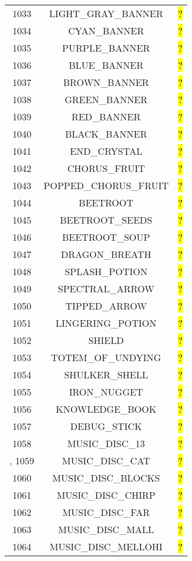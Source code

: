 \documentclass[11pt]{article}
\newcommand\myworries[1]{\sethlcolor{red}\hl{#1}}
\begin{document}
\begin{longtable}{ |c|c|c| }
1033 & LIGHT\_GRAY\_BANNER & \myworries{?} \\
1034 & CYAN\_BANNER & \myworries{?} \\
1035 & PURPLE\_BANNER & \myworries{?} \\
1036 & BLUE\_BANNER & \myworries{?} \\
1037 & BROWN\_BANNER & \myworries{?} \\
1038 & GREEN\_BANNER & \myworries{?} \\
1039 & RED\_BANNER & \myworries{?} \\
1040 & BLACK\_BANNER & \myworries{?} \\
1041 & END\_CRYSTAL & \myworries{?} \\
1042 & CHORUS\_FRUIT & \myworries{?} \\
1043 & POPPED\_CHORUS\_FRUIT & \myworries{?} \\
1044 & BEETROOT & \myworries{?} \\
1045 & BEETROOT\_SEEDS & \myworries{?} \\
1046 & BEETROOT\_SOUP & \myworries{?} \\
1047 & DRAGON\_BREATH & \myworries{?} \\
1048 & SPLASH\_POTION & \myworries{?} \\
1049 & SPECTRAL\_ARROW & \myworries{?} \\
1050 & TIPPED\_ARROW & \myworries{?} \\
1051 & LINGERING\_POTION & \myworries{?} \\
1052 & SHIELD & \myworries{?} \\
1053 & TOTEM\_OF\_UNDYING & \myworries{?} \\
1054 & SHULKER\_SHELL & \myworries{?} \\
1055 & IRON\_NUGGET & \myworries{?} \\
1056 & KNOWLEDGE\_BOOK & \myworries{?} \\
1057 & DEBUG\_STICK & \myworries{?} \\
1058 & MUSIC\_DISC\_13 & \myworries{?} \\,
1059 & MUSIC\_DISC\_CAT & \myworries{?} \\
1060 & MUSIC\_DISC\_BLOCKS & \myworries{?} \\
1061 & MUSIC\_DISC\_CHIRP & \myworries{?} \\
1062 & MUSIC\_DISC\_FAR & \myworries{?} \\
1063 & MUSIC\_DISC\_MALL & \myworries{?} \\
1064 & MUSIC\_DISC\_MELLOHI & \myworries{?} \\

\end{longtable}
\end{document}
